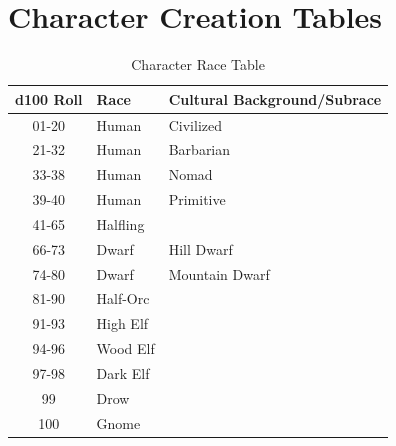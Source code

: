 \documentclass{article}
\begin{document}
\section{Character Creation Tables}

\begin{table}
\caption{Character Race Table}
\label{tab:character_race_table}
\begin{tabular}{|c|l|l|}
\hline
d100 Roll & Race & Cultural Background/Subrace \\
\hline
01-20 & Human & Civilized \\
21-32 & Human & Barbarian \\
33-38 & Human & Nomad \\
39-40 & Human & Primitive \\
41-65 & Halfling &  \\
66-73 & Dwarf & Hill Dwarf \\
74-80 & Dwarf & Mountain Dwarf \\
81-90 & Half-Orc &  \\
91-93 & High Elf &  \\
94-96 & Wood Elf &  \\
97-98 & Dark Elf &  \\
99 & Drow &  \\
100 & Gnome &  \\
\hline
\end{tabular}
\end{table}

\newpage
\end{document}
